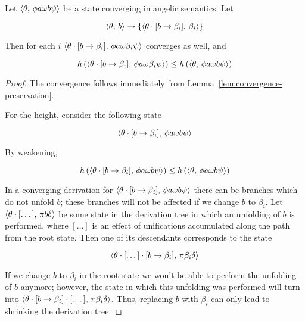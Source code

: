 
\begin{lemma}
  \label{lem:height-mono}
  Let $\langle \theta,\,\phi a \omega b \psi \rangle$ be a state converging in angelic semantics. Let
  
  \[
  \langle \theta,\,b \rangle\to\{\langle \theta\cdot[b\to\beta_i],\,\beta_i \rangle\}
  \]

  Then for each $i$ $\langle \theta\cdot[b\to\beta_i],\,\phi a \omega \beta_i \psi \rangle$ converges as well,
  and

  \[
  h\,(\langle \theta\cdot[b\to\beta_i],\,\phi a \omega \beta_i \psi \rangle)\le h\,(\langle \theta,\,\phi a \omega b \psi \rangle)
  \]  
\end{lemma}
\begin{proof}
  The convergence follows immediately from Lemma~\ref{lem:convergence-preservation}.
  
  For the height, consider the following state

  \[
   \langle \theta\cdot[b\to\beta_i],\,\phi a \omega b \psi \rangle
  \]

  By weakening,

  \[
  h\,(\langle \theta\cdot[b\to\beta_i],\,\phi a \omega b \psi \rangle)\le h\,( \langle \theta,\,\phi a \omega b \psi \rangle)
  \]

  In a converging derivation for $\langle \theta\cdot[b\to\beta_i],\,\phi a \omega b \psi \rangle$ there can be branches which do not unfold $b$; these
  branches will not be affected if we change $b$ to $\beta_i$. Let $\langle \theta\cdot[\dots],\,\pi b \delta \rangle$ be some state in the derivation
  tree in which an unfolding of $b$ is performed, where $[\dots]$ is an effect of unifications accumulated along the path from the root state.
  Then one of its descendants corresponds to the state

  \[
  \langle \theta\cdot[\dots]\cdot[b\to\beta_i],\,\pi\beta_i\delta \rangle
  \]
  
  If we change $b$ to $\beta_i$ in the root state we won't be able to perform the unfolding of $b$ anymore; however, the state in which this
  unfolding was performed will turn into $\langle \theta\cdot[b\to\beta_i]\cdot[\dots],\,\pi\beta_i\delta \rangle$. Thus, replacing $b$ with $\beta_i$
  can only lead to shrinking the derivation tree.
\end{proof}

